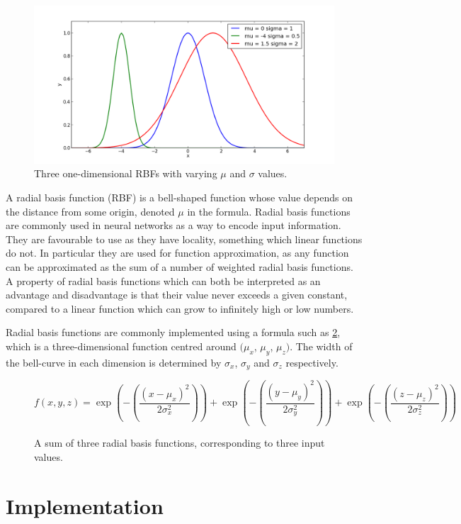 \documentclass[a4paper,11pt]{kth-mag}
\begin{document}
\begin{figure}
\centering\includegraphics[scale=0.5]{rbf_1d.png}
\caption{Three one-dimensional RBFs with varying $\mu$ and $\sigma$ values.}
\label{3-rbf-functions}
\end{figure}

A radial basis function (RBF) is a bell-shaped function whose value depends on the distance from some origin, denoted $\mu$ in the formula.  Radial basis functions are commonly used in neural networks as a way to encode input information. They are favourable to use as they have locality, something which linear functions do not. In particular they are used for function approximation, as any function can be approximated as the sum of a number of weighted radial basis functions. A property of radial basis functions which can both be interpreted as an advantage and disadvantage is that their value never exceeds a given constant, compared to a linear function which can grow to infinitely high or low numbers.

Radial basis functions are commonly implemented using a formula such as \ref{RBF_1}, which is a three-dimensional function centred around $(\mu _{x}$, $\mu _{y}$, $\mu _{z})$. The width of the bell-curve in each dimension is determined by $\sigma _{x}$, $\sigma _{y}$ and $\sigma _{z}$ respectively.

\begin{figure}
\begin{equation}
f(x,y,z) = \exp(-(\frac{(x-\mu_{x})^{2}}{2 \sigma _{x}^{2}})) + \exp(-(\frac{(y-\mu_{y})^{2}}{2 \sigma _{y}^{2}})) + \exp(-(\frac{(z-\mu_{z})^{2}}{2 \sigma _{z}^{2}}))
\end{equation}
\caption{A sum of three radial basis functions, corresponding to three input values.\label{RBF_1}}
\end{figure}

\chapter{Implementation}
\end{document}
